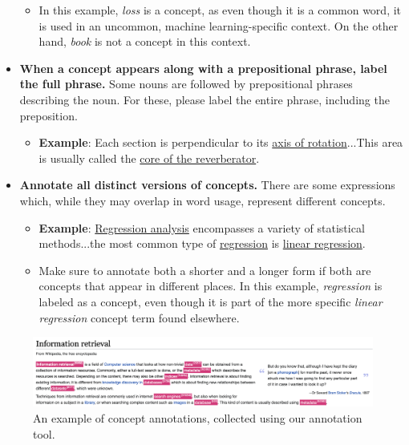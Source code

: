 \begin{itemize}
\begin{itemize}
     		 \item In this example, \textit{loss} is a concept, as even though it is a common word, it is used in an uncommon, machine learning-specific context. On the other hand, \textit{book} is not a concept in this context.
    	\end{itemize}
\item \textbf{When a concept appears along with a prepositional phrase, label the full phrase.} Some nouns are followed by prepositional phrases describing the noun. For these, please label the entire phrase, including the preposition.
	\vspace{-3.5mm}
	\begin{itemize}
		\setlength\itemsep{-1em}
      		\item \textbf{Example}: Each section is perpendicular to its \underline{axis of rotation}...This area is usually called the \underline{core of the reverberator}.
    	\end{itemize}
\item \textbf{Annotate all distinct versions of concepts.} There are some expressions which, while they may overlap in word usage, represent different concepts. 
	\vspace{-3.5mm}
	\begin{itemize}
		\setlength\itemsep{-1em}
      		\item \textbf{Example}: \underline{Regression analysis} encompasses a variety of statistical methods...the most common type of \underline{regression} is \underline{linear regression}.
		\item Make sure to annotate both a shorter and a longer form if both are concepts that appear in different places. In this example, \textit{regression} is labeled as a concept, even though it is part of the more specific  \textit{linear regression} concept term found elsewhere.
    	\end{itemize}
\end{itemize}

\begin{figure}
    \centering
    \includegraphics[width=\textwidth]{pictures/concept_annotation_example.png}
     \caption{An example of concept annotations, collected using our annotation tool.}
    \label{fig:concept_annotation_example}
\end{figure}

